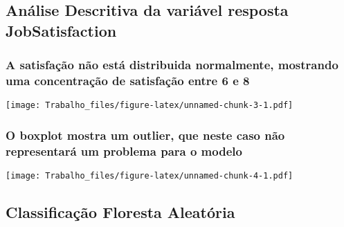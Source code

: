 \documentclass[]{article}
\newenvironment{Shaded}{\begin{snugshade}}{\end{snugshade}}
\newcommand{\KeywordTok}[1]{\textcolor[rgb]{0.13,0.29,0.53}{\textbf{#1}}}
\newcommand{\DataTypeTok}[1]{\textcolor[rgb]{0.13,0.29,0.53}{#1}}
\newcommand{\StringTok}[1]{\textcolor[rgb]{0.31,0.60,0.02}{#1}}
\newcommand{\OperatorTok}[1]{\textcolor[rgb]{0.81,0.36,0.00}{\textbf{#1}}}
\newcommand{\NormalTok}[1]{#1}
\begin{document}
\subsection{Análise Descritiva da variável resposta
JobSatisfaction}\label{analise-descritiva-da-variavel-resposta-jobsatisfaction}

\subsubsection{A satisfação não está distribuida normalmente, mostrando
uma concentração de satisfação entre 6 e
8}\label{a-satisfacao-nao-esta-distribuida-normalmente-mostrando-uma-concentracao-de-satisfacao-entre-6-e-8}

\begin{Shaded}
\end{Shaded}

\texttt{[image: Trabalho\_files/figure-latex/unnamed-chunk-3-1.pdf]}

\subsubsection{O boxplot mostra um outlier, que neste caso não
representará um problema para o
modelo}\label{o-boxplot-mostra-um-outlier-que-neste-caso-nao-representara-um-problema-para-o-modelo}

\begin{Shaded}
\end{Shaded}

\texttt{[image: Trabalho\_files/figure-latex/unnamed-chunk-4-1.pdf]}

\subsection{Classificação Floresta
Aleatória}\label{classificacao-floresta-aleatoria}
\end{document}
